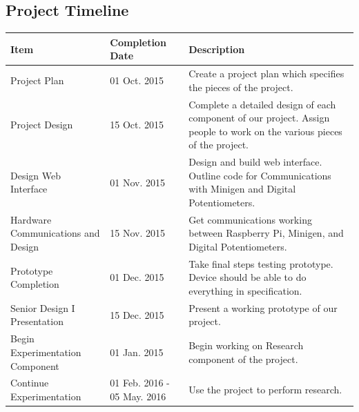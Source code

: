 \documentclass{article}	%
\begin{document}
\subsection{Project Timeline}
\begin{center}
    \begin{tabularx}{\textwidth}{|X|X|X|}
        \hline
        
        \textbf{Item} & 
        \textbf{Completion Date} & 
        \textbf{Description} \\
        \hline

        Project Plan & 
        01 Oct. 2015 & 
        \multicolumn{1}{|p{12cm}|}{\centering 
        Create a project plan which specifies the pieces of the project.
        } \\
        \hline

        Project Design & 
        15 Oct. 2015 & 
        \multicolumn{1}{|p{12cm}|}{\centering 
        Complete a detailed design of each component of our project. Assign people to work on the various pieces of the project.
        } \\
        \hline

        Design Web Interface & 
        01 Nov. 2015 & 
        \multicolumn{1}{|p{12cm}|}{\centering 
        Design and build web interface.
        Outline code for Communications with Minigen and Digital Potentiometers.
        } \\
        \hline

        Hardware Communications and Design & 
        15 Nov. 2015 & 
        \multicolumn{1}{|p{12cm}|}{\centering 
        Get communications working between Raspberry Pi, Minigen, and Digital Potentiometers.
        } \\
        \hline

        Prototype Completion & 
        01 Dec. 2015 & 
        \multicolumn{1}{|p{12cm}|}{\centering 
        Take final steps testing prototype. Device should be able to do everything in specification.
        } \\
        \hline

        Senior Design I Presentation & 
        15 Dec. 2015 & 
        \multicolumn{1}{|p{12cm}|}{\centering 
        Present a working prototype of our project.
        } \\
        \hline

        Begin Experimentation Component & 
        01 Jan. 2015 & 
        \multicolumn{1}{|p{12cm}|}{\centering 
        Begin working on Research component of the project.
        } \\
        \hline

        Continue Experimentation & 
        01 Feb. 2016 - 05 May. 2016 & 
        \multicolumn{1}{|p{12cm}|}{\centering 
        Use the project to perform research.
        } \\
        \hline
    \end{tabularx}
\end{center}
\end{document}
